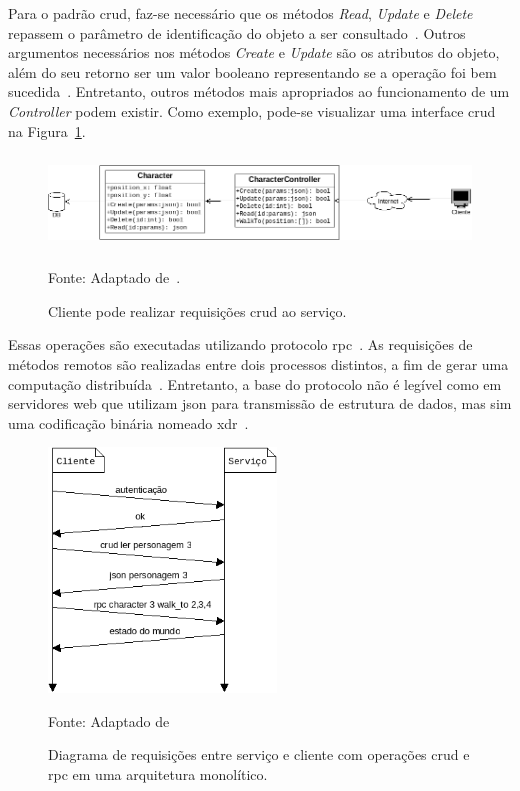 Para o padrão \ac{crud}, faz-se necessário que os métodos \textit{Read}, \textit{Update} e \textit{Delete} repassem o parâmetro de identificação do objeto a ser consultado~\cite{LeckyThompson2008Nov}.
%
Outros argumentos necessários nos métodos \textit{Create} e \textit{Update} são os atributos do objeto, além do seu retorno ser um valor booleano representando se a operação foi bem sucedida~\cite{Chadwick2012Oct, LeckyThompson2008Nov}.
%
Entretanto, outros métodos mais apropriados ao funcionamento de um \textit{Controller} podem existir.
%
Como exemplo, pode-se visualizar uma interface \ac{crud} na Figura~\ref{fig:crud}.



\begin{figure}[htb!]
\caption{Cliente pode realizar requisições \ac{crud} ao serviço.}
\label{fig:crud}
\includegraphics[height=2.5cm]{img/cap2/crud.png}
\centering

Fonte: Adaptado de~\cite{albion_online_unite}.
\end{figure}



Essas operações são executadas utilizando protocolo \ac{rpc}~\cite{albion_online_unite}.
%
As requisições de métodos remotos são realizadas entre dois processos distintos, a fim de gerar uma computação distribuída~\cite{rpc}.
%
Entretanto, a base do protocolo não é legível como em servidores web que utilizam \ac{json} para transmissão de estrutura de dados, mas sim uma codificação binária nomeado \ac{xdr}~\cite{xdr}.

\begin{figure}[htb!]
\caption{Diagrama de requisições entre serviço e cliente com operações \ac{crud} e \ac{rpc} em uma arquitetura monolítico.}
\label{fig:network_crud_rpc}
\includegraphics[height=6.5cm]{img/cap2/network_rpc_crud.png}
\centering

Fonte: Adaptado de~\cite{LeckyThompson2008Nov}
\end{figure}



